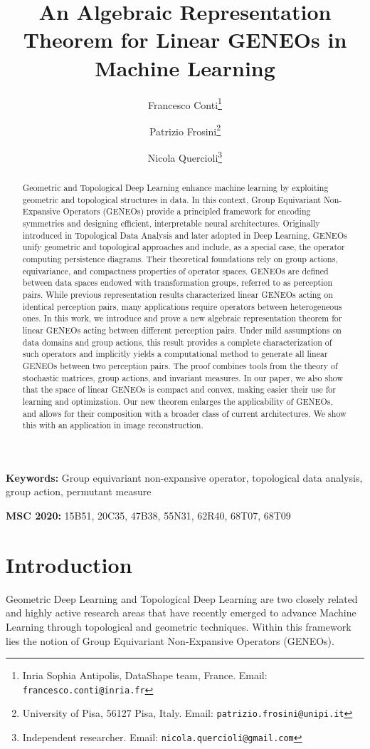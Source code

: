 \documentclass[11pt]{article}
\title{An Algebraic Representation Theorem for Linear GENEOs in Machine Learning}
\author{Francesco Conti\thanks{Inria Sophia Antipolis, DataShape team, France. Email: \texttt{francesco.conti@inria.fr}} \and 
Patrizio Frosini\thanks{University of Pisa, 56127 Pisa, Italy. Email: \texttt{patrizio.frosini@unipi.it}} \and 
Nicola Quercioli\thanks{Independent researcher. Email: \texttt{nicola.quercioli@gmail.com}}}
\date{}
\begin{document}
\maketitle

\begin{abstract}
Geometric and Topological Deep Learning enhance machine learning by exploiting geometric and topological structures in data. In this context, Group Equivariant Non-Expansive Operators (GENEOs) provide a principled framework for encoding symmetries and designing efficient, interpretable neural architectures. Originally introduced in Topological Data Analysis and later adopted in Deep Learning, GENEOs unify geometric and topological approaches and include, as a special case, the operator computing persistence diagrams. Their theoretical foundations rely on group actions, equivariance, and compactness properties of operator spaces. GENEOs are defined between data spaces endowed with transformation groups, referred to as perception pairs. 
While previous representation results characterized linear GENEOs acting on identical perception pairs, many applications require operators between heterogeneous ones. In this work, we introduce and prove a new algebraic representation theorem for linear GENEOs acting between different perception pairs. Under mild assumptions on data domains and group actions, this result provides a complete characterization of such operators and implicitly yields a computational method to generate all linear GENEOs between two perception pairs. The proof combines tools from the theory of stochastic matrices, group actions, and invariant measures. In our paper, we also show that the space of linear GENEOs is compact and convex, making easier their use for learning and optimization. 
Our new theorem enlarges the applicability of GENEOs, and allows for their composition with a broader class of current architectures. We show this with an application in image reconstruction.
\end{abstract}

\medskip
\noindent\textbf{Keywords:} Group equivariant non-expansive operator, topological data analysis, group action, permutant measure

\medskip
\noindent\textbf{MSC 2020:} 15B51, 20C35, 47B38, 55N31, 62R40, 68T07, 68T09

\section{Introduction}
Geometric Deep Learning \cite{Br17,BrBr21} and Topological Deep Learning \cite{Ri19,Ho19,Ca20,We21,Zia2024} are two closely related and highly active research areas that have recently emerged to advance Machine Learning through topological and geometric techniques. Within this framework lies the notion of Group Equivariant Non-Expansive Operators (GENEOs).
\end{document}
